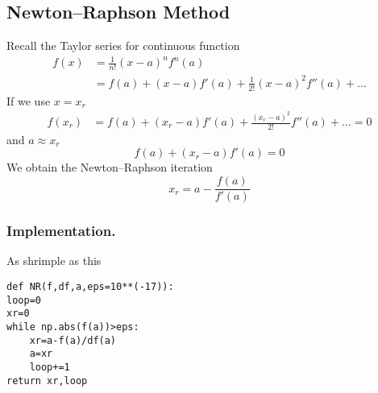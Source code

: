 \documentclass[../../../main.tex]{subfiles}
\begin{document}
\subsection{Newton–Raphson Method}
Recall the Taylor series for continuous function
\begin{align*}
    f(x) & =         \frac{1}{n!}(x-a)^n f^{n}(a)              \\
         & =   f(a)+(x-a)f'(a)+\frac{1}{2!}(x-a)^2f''(a)+\dots
\end{align*}
If we use $x=x_r$
\begin{align*}
    f(x_r) & =  f(a)+(x_r-a)f'(a)+\frac{(x_r-a)^2}{2!}f''(a)+\dots=0
\end{align*}
and $a \approx x_r$
\begin{equation*}
    f(a)+(x_r-a)f'(a)=0
\end{equation*}
We obtain the Newton–Raphson iteration
\begin{equation*}
    x_r=a-\frac{f(a )}{f'(a)}
\end{equation*}

\subsubsection{Implementation.}
As shrimple as this
\begin{verbatim}
def NR(f,df,a,eps=10**(-17)):
loop=0 
xr=0
while np.abs(f(a))>eps:
    xr=a-f(a)/df(a)
    a=xr 
    loop+=1
return xr,loop
\end{verbatim}
\end{document}
